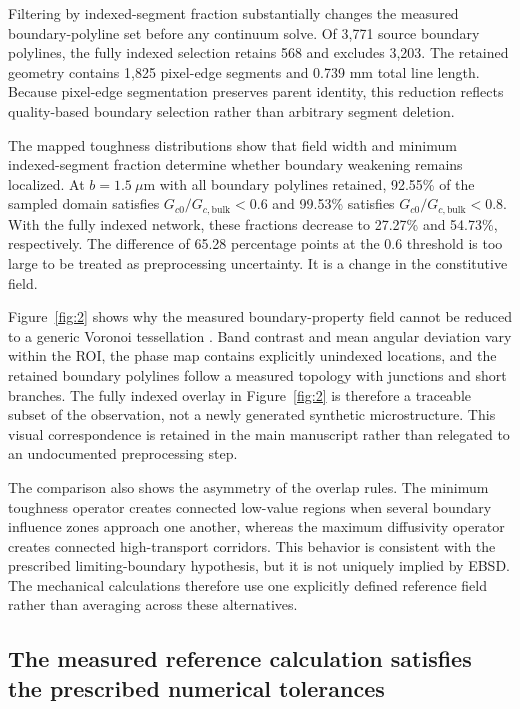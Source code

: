 \documentclass[preprint,12pt]{elsarticle}
\begin{document}
Filtering by indexed-segment fraction substantially changes the measured boundary-polyline set before any continuum solve. Of 3,771 source boundary polylines, the fully indexed selection retains 568 and excludes 3,203. The retained geometry contains 1,825 pixel-edge segments and 0.739 mm total line length. Because pixel-edge segmentation preserves parent identity, this reduction reflects quality-based boundary selection rather than arbitrary segment deletion.

The mapped toughness distributions show that field width and minimum indexed-segment fraction determine whether boundary weakening remains localized. At \(b=1.5~\mu\mathrm{m}\) with all boundary polylines retained, 92.55\% of the sampled domain satisfies \(G_{c0}/G_{c,\mathrm{bulk}}<0.6\) and 99.53\% satisfies \(G_{c0}/G_{c,\mathrm{bulk}}<0.8\). With the fully indexed network, these fractions decrease to 27.27\% and 54.73\%, respectively. The difference of 65.28 percentage points at the 0.6 threshold is too large to be treated as preprocessing uncertainty. It is a change in the constitutive field.

Figure~\ref{fig:2} shows why the measured boundary-property field cannot be reduced to a generic Voronoi tessellation \cite{quey2011}. Band contrast and mean angular deviation vary within the ROI, the phase map contains explicitly unindexed locations, and the retained boundary polylines follow a measured topology with junctions and short branches. The fully indexed overlay in Figure~\ref{fig:2} is therefore a traceable subset of the observation, not a newly generated synthetic microstructure. This visual correspondence is retained in the main manuscript rather than relegated to an undocumented preprocessing step.

The comparison also shows the asymmetry of the overlap rules. The minimum toughness operator creates connected low-value regions when several boundary influence zones approach one another, whereas the maximum diffusivity operator creates connected high-transport corridors. This behavior is consistent with the prescribed limiting-boundary hypothesis, but it is not uniquely implied by EBSD. The mechanical calculations therefore use one explicitly defined reference field rather than averaging across these alternatives.

\subsection{The measured reference calculation satisfies the prescribed numerical tolerances}
\end{document}

